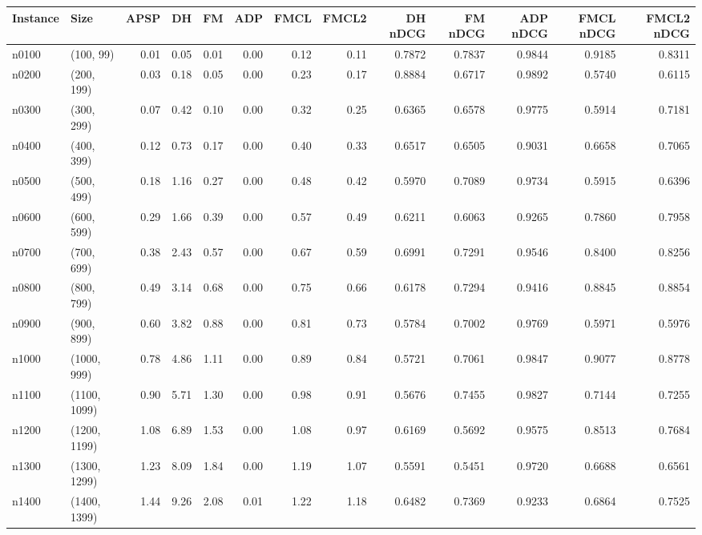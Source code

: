 \begin{tabular}{llrrrrrrrrrrr}
\toprule
Instance &         Size &  APSP &    DH &   FM &  ADP &  FMCL &  FMCL2 &  DH nDCG &  FM nDCG &  ADP nDCG &  FMCL nDCG &  FMCL2 nDCG \\
\midrule
   n0100 &    (100, 99) &  0.01 &  0.05 & 0.01 & 0.00 &  0.12 &   0.11 &   0.7872 &   0.7837 &    0.9844 &     0.9185 &      0.8311 \\
   n0200 &   (200, 199) &  0.03 &  0.18 & 0.05 & 0.00 &  0.23 &   0.17 &   0.8884 &   0.6717 &    0.9892 &     0.5740 &      0.6115 \\
   n0300 &   (300, 299) &  0.07 &  0.42 & 0.10 & 0.00 &  0.32 &   0.25 &   0.6365 &   0.6578 &    0.9775 &     0.5914 &      0.7181 \\
   n0400 &   (400, 399) &  0.12 &  0.73 & 0.17 & 0.00 &  0.40 &   0.33 &   0.6517 &   0.6505 &    0.9031 &     0.6658 &      0.7065 \\
   n0500 &   (500, 499) &  0.18 &  1.16 & 0.27 & 0.00 &  0.48 &   0.42 &   0.5970 &   0.7089 &    0.9734 &     0.5915 &      0.6396 \\
   n0600 &   (600, 599) &  0.29 &  1.66 & 0.39 & 0.00 &  0.57 &   0.49 &   0.6211 &   0.6063 &    0.9265 &     0.7860 &      0.7958 \\
   n0700 &   (700, 699) &  0.38 &  2.43 & 0.57 & 0.00 &  0.67 &   0.59 &   0.6991 &   0.7291 &    0.9546 &     0.8400 &      0.8256 \\
   n0800 &   (800, 799) &  0.49 &  3.14 & 0.68 & 0.00 &  0.75 &   0.66 &   0.6178 &   0.7294 &    0.9416 &     0.8845 &      0.8854 \\
   n0900 &   (900, 899) &  0.60 &  3.82 & 0.88 & 0.00 &  0.81 &   0.73 &   0.5784 &   0.7002 &    0.9769 &     0.5971 &      0.5976 \\
   n1000 &  (1000, 999) &  0.78 &  4.86 & 1.11 & 0.00 &  0.89 &   0.84 &   0.5721 &   0.7061 &    0.9847 &     0.9077 &      0.8778 \\
   n1100 & (1100, 1099) &  0.90 &  5.71 & 1.30 & 0.00 &  0.98 &   0.91 &   0.5676 &   0.7455 &    0.9827 &     0.7144 &      0.7255 \\
   n1200 & (1200, 1199) &  1.08 &  6.89 & 1.53 & 0.00 &  1.08 &   0.97 &   0.6169 &   0.5692 &    0.9575 &     0.8513 &      0.7684 \\
   n1300 & (1300, 1299) &  1.23 &  8.09 & 1.84 & 0.00 &  1.19 &   1.07 &   0.5591 &   0.5451 &    0.9720 &     0.6688 &      0.6561 \\
   n1400 & (1400, 1399) &  1.44 &  9.26 & 2.08 & 0.01 &  1.22 &   1.18 &   0.6482 &   0.7369 &    0.9233 &     0.6864 &      0.7525 \\

\end{tabular}
